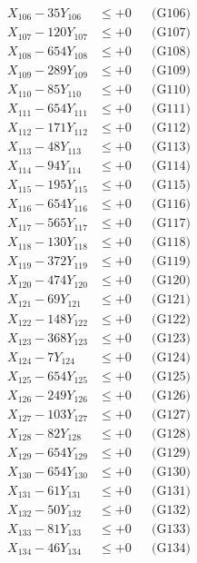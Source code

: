 \documentclass[a4paper,10pt]{article}
\begin{document}
{\begin{align}
X_{106} - 35Y_{106} &\leq +0 && \text{(G106)} \\
X_{107} - 120Y_{107} &\leq +0 && \text{(G107)} \\
X_{108} - 654Y_{108} &\leq +0 && \text{(G108)} \\
X_{109} - 289Y_{109} &\leq +0 && \text{(G109)} \\
X_{110} - 85Y_{110} &\leq +0 && \text{(G110)} \\
\allowbreak
X_{111} - 654Y_{111} &\leq +0 && \text{(G111)} \\
X_{112} - 171Y_{112} &\leq +0 && \text{(G112)} \\
X_{113} - 48Y_{113} &\leq +0 && \text{(G113)} \\
X_{114} - 94Y_{114} &\leq +0 && \text{(G114)} \\
X_{115} - 195Y_{115} &\leq +0 && \text{(G115)} \\
X_{116} - 654Y_{116} &\leq +0 && \text{(G116)} \\
X_{117} - 565Y_{117} &\leq +0 && \text{(G117)} \\
X_{118} - 130Y_{118} &\leq +0 && \text{(G118)} \\
X_{119} - 372Y_{119} &\leq +0 && \text{(G119)} \\
X_{120} - 474Y_{120} &\leq +0 && \text{(G120)} \\
\allowbreak
X_{121} - 69Y_{121} &\leq +0 && \text{(G121)} \\
X_{122} - 148Y_{122} &\leq +0 && \text{(G122)} \\
X_{123} - 368Y_{123} &\leq +0 && \text{(G123)} \\
X_{124} - 7Y_{124} &\leq +0 && \text{(G124)} \\
X_{125} - 654Y_{125} &\leq +0 && \text{(G125)} \\
X_{126} - 249Y_{126} &\leq +0 && \text{(G126)} \\
X_{127} - 103Y_{127} &\leq +0 && \text{(G127)} \\
X_{128} - 82Y_{128} &\leq +0 && \text{(G128)} \\
X_{129} - 654Y_{129} &\leq +0 && \text{(G129)} \\
X_{130} - 654Y_{130} &\leq +0 && \text{(G130)} \\
\allowbreak
X_{131} - 61Y_{131} &\leq +0 && \text{(G131)} \\
X_{132} - 50Y_{132} &\leq +0 && \text{(G132)} \\
X_{133} - 81Y_{133} &\leq +0 && \text{(G133)} \\
X_{134} - 46Y_{134} &\leq +0 && \text{(G134)} \\

\end{align}}
\end{document}
